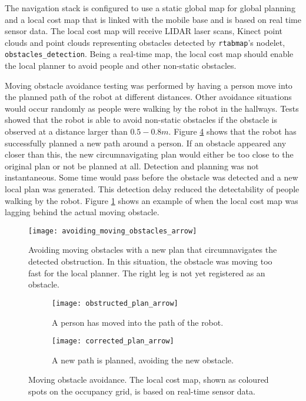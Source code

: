 The navigation stack is configured to use a static global map for global planning and a local cost map that is linked with the mobile base and is based on real time sensor data. The local cost map will receive LIDAR laser scans, Kinect point clouds and point clouds representing obstacles detected by \texttt{rtabmap}'s nodelet, \texttt{obstacles\_detection}. Being a real-time map, the local cost map should enable the local planner to avoid people and other non-static obstacles.

Moving obstacle avoidance testing was performed by having a person move into the planned path of the robot at different distances. Other avoidance situations would occur randomly as people were walking by the robot in the hallways. Tests showed that the robot is able to avoid non-static obstacles if the obstacle is observed at a distance larger than $0.5 - 0.8 m$. Figure \ref{fig:obstacle_avoidance} shows that the robot has successfully planned a new path around a person. If an obstacle appeared any closer than this, the new circumnavigating plan would either be too close to the original plan or not be planned at all. Detection and planning was not instantaneous. Some time would pass before the obstacle was detected and a new local plan was generated. This detection delay reduced the detectability of people walking by the robot. Figure \ref{fig:avoiding_moving_obstacles} shows an example of when the local cost map was lagging behind the actual moving obstacle.



\begin{figure}[p]
	\centering
	\texttt{[image: avoiding\_moving\_obstacles\_arrow]}
	\caption{Avoiding moving obstacles with a new plan that circumnavigates the detected obstruction. In this situation, the obstacle was moving too fast for the local planner. The right leg is not yet registered as an obstacle.}
	\label{fig:avoiding_moving_obstacles}
\end{figure}

\begin{figure}
	\centering
	\begin{subfigure}[b]{0.46\textwidth}
		\texttt{[image: obstructed\_plan\_arrow]}
		\caption{A person has moved into the path of the robot.}
		\label{fig:obstructed_plan}
	\end{subfigure}
	\begin{subfigure}[b]{0.472\textwidth}
		\texttt{[image: corrected\_plan\_arrow]}
		\caption{A new path is planned, avoiding the new obstacle.}
		\label{fig:corrected_plan}
	\end{subfigure}
	\caption{Moving obstacle avoidance. The local cost map, shown as coloured spots on the occupancy grid, is based on real-time sensor data. }\label{fig:obstacle_avoidance}
\end{figure}
